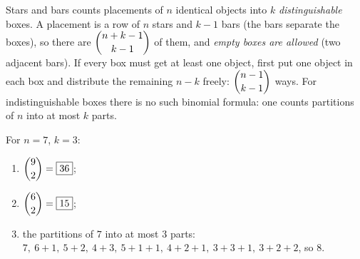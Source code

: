 Stars and bars counts placements of $n$ identical objects into $k$ \emph{distinguishable} boxes. A placement is a row of $n$ stars and $k-1$ bars (the bars separate the boxes), so there are $\dbinom{n+k-1}{k-1}$ of them, and \emph{empty boxes are allowed} (two adjacent bars). If every box must get at least one object, first put one object in each box and distribute the remaining $n-k$ freely: $\dbinom{n-1}{k-1}$ ways. For indistinguishable boxes there is no such binomial formula: one counts partitions of $n$ into at most $k$ parts.

For $n=7$, $k=3$:
\begin{enumerate}
\item $\dbinom{9}{2}=\boxed{36}$;
\item $\dbinom{6}{2}=\boxed{15}$;
\item the partitions of $7$ into at most $3$ parts: $7,\ 6+1,\ 5+2,\ 4+3,\ 5+1+1,\ 4+2+1,\ 3+3+1,\ 3+2+2$, so $\boxed{8}$.
\end{enumerate}

